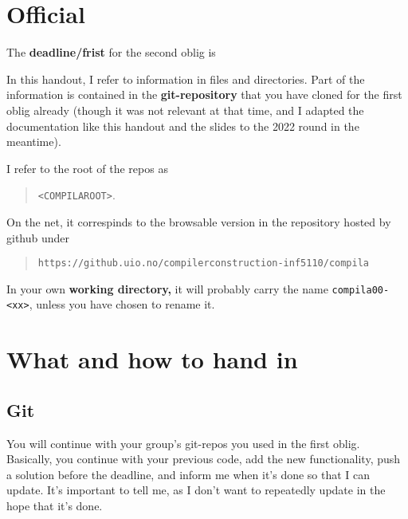 \documentclass[11pt,freeform]{handout}[2014/08/13]
\begin{document}
\thispagestyle{empty}



\section{Official }
\label{sec:official-info}




\hrulefill{}

The \textbf{deadline/frist}  for the second oblig is

\begin{quote}
  \textbf{\deadlinetwo}
\end{quote}





In this handout, I refer to information in files and directories. Part of
the information is contained in the \textbf{git-repository} that you have
cloned for the first oblig already (though it was not relevant at that
time, and I adapted the documentation like this handout and the slides to
the 2022 round in the meantime).

I refer to the root of the repos as 
\begin{quote}
  \texttt{<COMPILAROOT>}.   
\end{quote}
On the net, it correspinds to the browsable version in the repository
hosted by github under

\begin{quote}
  \texttt{https://github.uio.no/compilerconstruction-inf5110/compila}
\end{quote}

In your own \textbf{working directory,} it will probably carry the name
\texttt{compila00-<xx>}, unless you have chosen to rename it.




\section{What and how to hand in}
\label{sec:what-how}


\subsection{Git}
\label{sec:git}

You will continue with your group's git-repos you used in the first oblig.
Basically, you continue with your previous code, add the new functionality,
push a solution before the deadline, and inform me when it's done so that I
can update. It's important to tell me, as I don't want to repeatedly update
in the hope that it's done.
\end{document}
